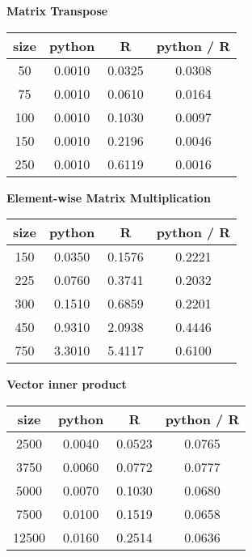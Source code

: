 \documentclass[11pt]{article}
\begin{document}
\begin{center}
    \textbf{Matrix Transpose} \\
\begin{tabular}{cccc}
size  & python  &  R       & python / R \\
  \hline
50  & 0.0010  & 0.0325 & 0.0308 \\
75  & 0.0010  & 0.0610 & 0.0164 \\
100 & 0.0010  & 0.1030 & 0.0097 \\
150 & 0.0010  & 0.2196 & 0.0046 \\
250 & 0.0010  & 0.6119 & 0.0016 \\
\end{tabular}
\end{center}

\begin{center}
    \textbf{Element-wise Matrix Multiplication} \\
\begin{tabular}{cccc}
size  & python  &  R       & python / R \\
  \hline
150   & 0.0350  &  0.1576  &  0.2221 \\
225   & 0.0760  &  0.3741  &  0.2032 \\
300   & 0.1510  &  0.6859  &  0.2201 \\
450   & 0.9310  &  2.0938  &  0.4446 \\
750   & 3.3010  &  5.4117  &  0.6100 \\
\end{tabular}
\end{center}

\begin{center}
    \textbf{Vector inner product} \\
\begin{tabular}{cccc}
size  & python  &  R       & python / R \\
  \hline
2500  & 0.0040 & 0.0523 & 0.0765 \\
3750  & 0.0060 & 0.0772 & 0.0777 \\
5000  & 0.0070 & 0.1030 & 0.0680 \\
7500  & 0.0100 & 0.1519 & 0.0658 \\
12500 & 0.0160 & 0.2514 & 0.0636 \\
\end{tabular}
\end{center}
\end{document}
